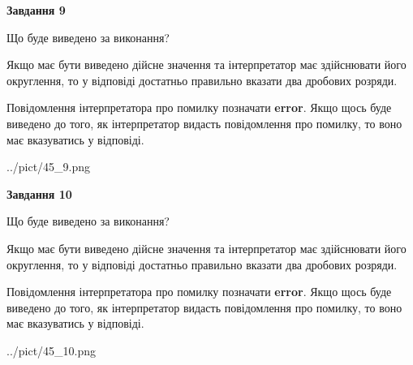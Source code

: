 \documentclass[12pt, ukrainian]{article}
\begin{document}
{\begin {Large}
{\begin {center}\textbf{Завдання 9}\end {center}}\par
Що буде виведено за виконання? \par

Якщо має бути виведено дійсне значення та інтерпретатор має здійснювати його округлення, 
то у відповіді достатньо правильно вказати два дробових розряди.

Повідомлення інтерпретатора про помилку позначати \textbf{error}.
Якщо щось буде виведено до того, як інтерпретатор видасть повідомлення про помилку, 
то воно має вказуватись у відповіді. \par

\begin{center}
	{../pict/45_9.png}
\end{center}
\newpage

{\begin {center}\textbf{Завдання 10}\end {center}}\par
Що буде виведено за виконання? \par

Якщо має бути виведено дійсне значення та інтерпретатор має здійснювати його округлення, 
то у відповіді достатньо правильно вказати два дробових розряди.

Повідомлення інтерпретатора про помилку позначати \textbf{error}.
Якщо щось буде виведено до того, як інтерпретатор видасть повідомлення про помилку, 
то воно має вказуватись у відповіді. \par

\begin{center}
	{../pict/45_10.png}
\end{center}
\newpage

\end {Large}}
\end{document}
